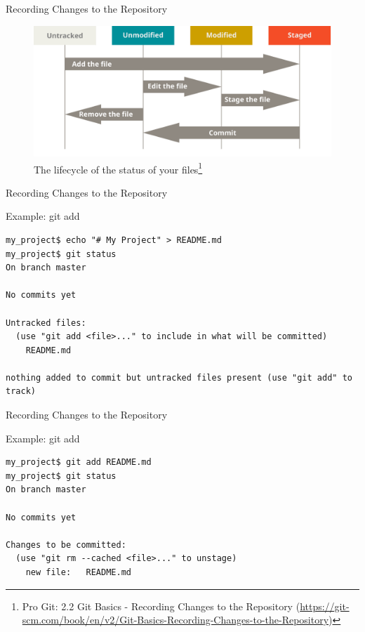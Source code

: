\documentclass[aspectratio=169]{beamer}
\renewcommand{\footnotesize}{\tiny}
\newcommand{\sectiontitle}{}
\begin{document}
\begin{frame}{Recording Changes to the Repository}{\sectiontitle}
\begin{figure}
    \centering
    \includegraphics[width=\textwidth,height=0.6\textheight,keepaspectratio]{lifecycle}
    \caption{
        The lifecycle of the status of your files\footnote{
            Pro Git: 2.2 Git Basics - Recording Changes to the Repository
            (\url{https://git-scm.com/book/en/v2/Git-Basics-Recording-Changes-to-the-Repository})
        }
    }
\end{figure}
\end{frame}

\begin{frame}[fragile]{Recording Changes to the Repository}{\sectiontitle}
\begin{block}{Example: \ttfamily git add}
\begin{verbatim}
my_project$ echo "# My Project" > README.md
my_project$ git status 
On branch master

No commits yet

Untracked files:
  (use "git add <file>..." to include in what will be committed)
    README.md

nothing added to commit but untracked files present (use "git add" to track)
\end{verbatim}
\end{block}
\end{frame}

\begin{frame}[fragile]{Recording Changes to the Repository}{\sectiontitle}
\begin{block}{Example: \ttfamily git add}
\begin{verbatim}
my_project$ git add README.md
my_project$ git status 
On branch master

No commits yet

Changes to be committed:
  (use "git rm --cached <file>..." to unstage)
    new file:   README.md
\end{verbatim}
\end{block}
\end{frame}
\end{document}
